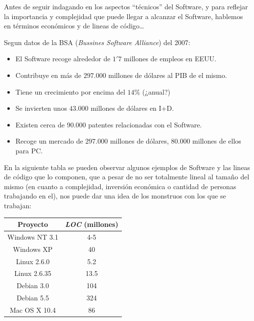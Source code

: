 Antes de seguir indagando en los aspectos ``técnicos'' del Software, y para reflejar la importancia y complejidad 
que puede llegar a alcanzar el Software, hablemos en términos económicos y de lineas de código\dots

Segun datos de la BSA (\textit{Bussines Software Alliance}) del 2007:
\begin{itemize}
    \item El Software recoge alrededor de $1'7$ millones de empleos en EEUU.
    \item Contribuye en más de $297.000$ millones de dólares al PIB de el mismo.
    \item Tiene un crecimiento por encima del $14\%$ (¿anual?)
    \item Se invierten unos $43.000$ millones de dólares en I+D.
    \item Existen cerca de $90.000$ patentes relacionadas con el Software.
    \item Recoge un mercado de $297.000$ millones de dólares, $80.000$ millones de ellos para PC.
\end{itemize}

En la siguiente tabla se pueden observar algunos ejemplos de Software y las lineas de código que lo componen,
que a pesar de no ser totalmente lineal al tamaño del mismo (en cuanto a complejidad, inversión económica o cantidad
de personas trabajando en el), nos puede dar una idea de los monstruos con los que se trabajan:
\begin{table}[h]
    \centering
    \begin{tabular}{cc}
        \hline
        Proyecto        & \textit{LOC} (millones)   \\
        \hline
        Windows NT 3.1  & 4-5                       \\
        Windows XP      & 40                        \\
        \hline
        Linux 2.6.0     & 5.2                       \\
        Linux 2.6.35    & 13.5                      \\
        \hline
        Debian 3.0      & 104                       \\
        Debian 5.5      & 324                       \\
        \hline
        Mac OS X 10.4   & 86                        \\
        \hline
    \end{tabular}
\end{table}

